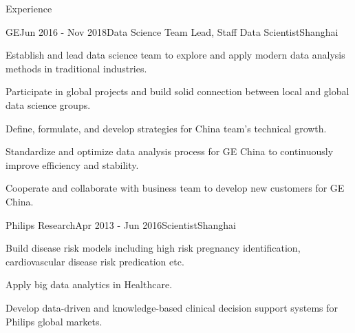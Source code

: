 \documentclass{resume} %
\begin{document}
\begin{rSection}{Experience}

\begin{rSubsection}{GE}{Jun 2016 - Nov 2018}{Data Science Team Lead, Staff Data Scientist}{Shanghai}
\item Establish and lead data science team to explore and apply modern data analysis methods in traditional industries.
\item Participate in global projects and build solid connection between local and global data science groups.
\item Define, formulate, and develop strategies for China team's technical growth.
\item Standardize and optimize data analysis process for GE China to continuously improve efficiency and stability.
\item Cooperate and collaborate with business team to develop new customers for GE China.
\end{rSubsection}


\begin{rSubsection}{Philips Research}{Apr 2013 - Jun 2016}{Scientist}{Shanghai}
\item Build disease risk models including high risk pregnancy identification, cardiovascular disease risk predication etc.
\item Apply big data analytics in Healthcare.
\item Develop data-driven and knowledge-based clinical decision support systems for Philips global markets.
\end{rSubsection}


\end{rSection}

\end{document}
